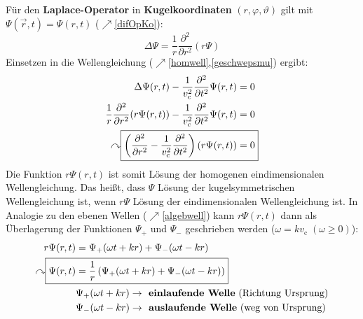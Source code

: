  Für den \textbf{Laplace-Operator} in \textbf{Kugelkoordinaten} \((r,\varphi,\vartheta)\) gilt mit $\Psi(\vec{r} ,t) = \Psi(r,t)$ ($\nearrow$\ref{difOpKo}):
		        \begin{equation}    
			        \boxed{\Delta \Psi  = \frac{1}{r}\frac{\partial^2}{\partial r^2}(r\Psi)}                                                                                                                               
		        \end{equation}
		  Einsetzen in die Wellengleichung ($\nearrow$\ref{homwell},\ref{geschwepsmu}) ergibt:
		        \begin{align}
			        \Delta \Psi(r,t) - \frac{1}{ v_\mathrm{c}^2}\frac{\partial^2}{\partial t^2}\Psi(r,t)                                                         & = 0  \nonumber\\
			        \frac{1}{r}\frac{\partial^2}{\partial r^2}(r\Psi(r,t)) - \frac{1}{ v_\mathrm{c}^2}\frac{\partial^2}{\partial t^2}\Psi(r,t)                   & = 0  \nonumber\\
			        \curvearrowright \Aboxed{\left(\frac{\partial^2}{\partial r^2} - \frac{1}{ v_\mathrm{c}^2}\frac{\partial^2}{\partial t^2}\right)(r\Psi(r,t)) & = 0}
		        \end{align}
		   Die Funktion \textbf{\(r\Psi(r,t)\)} ist somit Lösung der homogenen eindimensionalen Wellengleichung. Das heißt, dass $\Psi$ Lösung der kugelsymmetrischen Wellengleichung ist, wenn $r\Psi$ Lösung der eindimensionalen Wellengleichung ist. In Analogie zu den ebenen Wellen ($\nearrow$\ref{algebwell}) kann \(r\Psi(r,t)\) dann als Überlagerung der Funktionen \(\Psi_+\) und \(\Psi_-\) geschrieben werden ($\omega= k  v_\mathrm{c} \; (\omega \ge 0)$):
		        \begin{align}
			        r\Psi(r, t)                         & = \Psi_+(\omega t +  k r) + \Psi_-(\omega t -  k r) \nonumber  \\
			        \curvearrowright \Aboxed{\Psi(r, t) & = \frac{1}{r} \left(\Psi_+(\omega t +  k r) + \Psi_-(\omega t -  k r)\right)}                     \\
			                                            & \Psi_+(\omega t +  k r)   \to \textbf{ einlaufende Welle}\text{ (Richtung Ursprung)}                                             \nonumber\\
			                                            & \Psi_-(\omega t -  k r) \to \textbf{ auslaufende Welle}\text{ (weg von Ursprung)}      \nonumber
		        \end{align}

